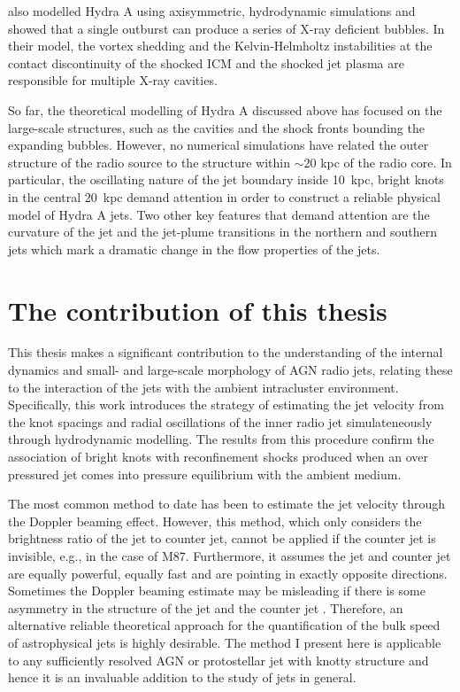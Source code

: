 \citet{rafaelovich12} also modelled Hydra A using axisymmetric, hydrodynamic simulations and showed that a single outburst can produce a series of X-ray deficient bubbles. In their model, the vortex shedding and the Kelvin-Helmholtz instabilities at the contact discontinuity of the shocked ICM and the shocked jet plasma are responsible for multiple X-ray cavities.

So far, the theoretical modelling of Hydra A discussed above has focused on the large-scale structures, such as the cavities and the shock fronts bounding the expanding bubbles. However, no numerical simulations have related the outer structure of the radio source to the structure within $\sim20$ kpc of the radio core. In particular, the oscillating nature of the jet boundary inside 10~kpc, bright knots in the central 20~kpc demand attention in order to construct a reliable physical model of Hydra A jets. Two other key features that demand attention are the curvature of the jet and the jet-plume transitions in the northern and southern jets which mark a dramatic change in the flow properties of the jets.


\section{The contribution of this thesis}\label{int:con}

This thesis makes a significant contribution to the understanding of the internal dynamics and small- and large-scale morphology of AGN radio jets, relating these to the interaction of the jets with the ambient intracluster environment. Specifically, this work introduces the strategy of estimating the jet velocity from the knot spacings and radial oscillations of the inner radio jet simulateneously through hydrodynamic modelling. The results from this procedure confirm the association of bright knots with reconfinement shocks produced when an over pressured jet comes into pressure equilibrium with the ambient medium.

The most common method to date has been to estimate the jet velocity through the Doppler beaming effect. However, this method, which only considers the brightness ratio of the jet to counter jet, cannot be applied if the counter jet is invisible, e.g., in the case of M87. Furthermore, it assumes the jet and counter jet are equally powerful, equally fast and are pointing in exactly opposite directions. Sometimes the Doppler beaming estimate may be misleading if there is some asymmetry in the structure of the jet and the counter jet \citep{kovalev07}. Therefore, an alternative reliable theoretical approach for the quantification of the bulk speed of astrophysical jets is highly desirable. The method I present here is applicable to any sufficiently resolved AGN or protostellar jet with knotty structure and hence it is an invaluable addition to the study of jets in general.  
 

